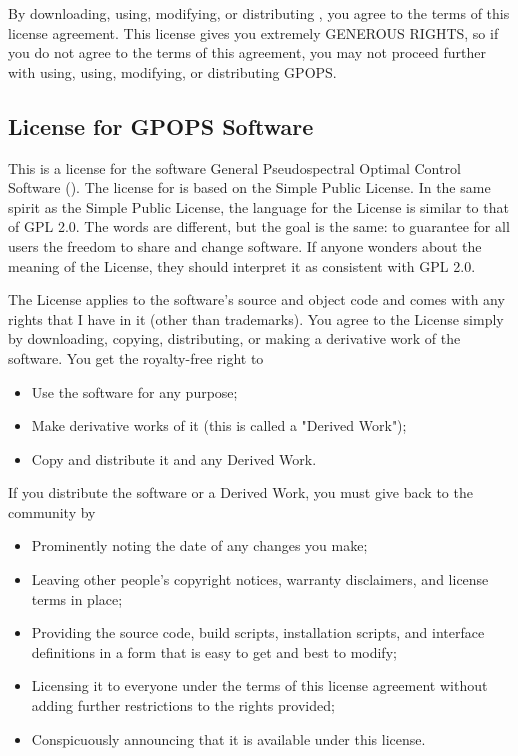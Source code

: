 By downloading, using, modifying, or distributing \gpops, you agree to
the terms of this license agreement.  This license gives you extremely
GENEROUS RIGHTS, so if you do not agree to the terms of this
agreement, you may not proceed further with using, using, modifying,
or distributing GPOPS.  

\subsection*{License for GPOPS Software}

This is a license for the software General Pseudospectral Optimal
Control Software (\gpops).  The license for \gpops is based on the
Simple Public License.  In the same spirit as the Simple Public
License, the language for the \gpops License is similar to that 
of GPL 2.0.  The words are different, but the goal is the same: 
to guarantee for all users the freedom to share and change       
software.  If anyone wonders about the meaning of the \gpops
License, they should interpret it as consistent with GPL 2.0.    
                                                                 
The \gpops License applies to the software's source and object    
code and comes with any rights that I have in it (other than     
trademarks). You agree to the \gpops License simply by            
downloading, copying, distributing, or making a derivative work  
of the software.  You get the royalty-free right to
\begin{itemize}
\item Use the software for any purpose;
\item Make derivative works of it (this is called a "Derived Work");                                            
\item Copy and distribute it and any Derived Work.
\end{itemize}
If you distribute the software or a Derived Work, you must give back
to the community by
\begin{itemize} 
\item Prominently noting the date of any changes you make;       
\item Leaving other people's copyright notices, warranty disclaimers,
and license terms in place;
\item Providing the source code, build scripts, installation scripts,
and interface definitions in a form that is easy to get and best to
modify;
\item Licensing it to everyone under the terms of this license
agreement without adding further restrictions to the rights provided;
\item Conspicuously announcing that it is available under this
license.
\end{itemize}

